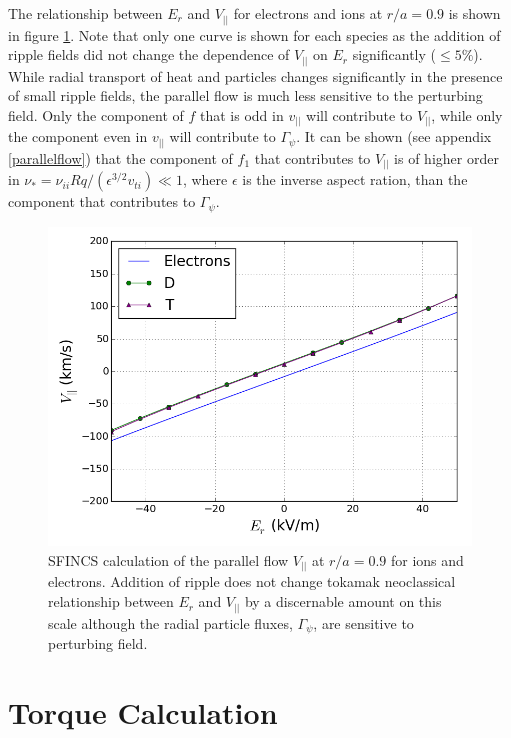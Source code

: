 \documentclass{article}
\numberwithin{figure}{section}
\numberwithin{equation}{section}
\begin{document}
The relationship between $E_r$ and $V_{||}$ for electrons and ions at $r/a = 0.9$ is shown in figure \ref{fig:Er_flow}. Note that only one curve is shown for each species as the addition of ripple fields did not change the dependence of $V_{||}$ on $E_r$ significantly ($\leq 5 \%$). While radial transport of heat and particles changes significantly in the presence of small ripple fields, the parallel flow is much less sensitive to the perturbing field. Only the component of $f$ that is odd in $v_{||}$ will contribute to $V_{||}$, while only the component even in $v_{||}$ will contribute to $\Gamma_{\psi}$. It can be shown (see appendix \ref{parallelflow}) that the component of $f_1$ that contributes to $V_{||}$ is of higher order in $\nu_* = \nu_{ii} Rq/(\epsilon^{3/2} v_{ti}) \ll 1 $, where $\epsilon$ is the inverse aspect ration, than the component that contributes to $\Gamma_{\psi}$. 

\begin{figure}[h!]
\centering
\includegraphics[width=.7\textwidth]{Er_flow.png}
\caption{\label{fig:Er_flow} SFINCS calculation of the parallel flow $V_{||}$ at $r/a = 0.9$ for ions and electrons. Addition of ripple does not change tokamak neoclassical relationship between $E_r$ and $V_{||}$ by a discernable amount on this scale although the radial particle fluxes, $\Gamma_{\psi}$, are sensitive to perturbing field.}
\end{figure}

\FloatBarrier

\section{Torque Calculation}\label{torque}
\end{document}
